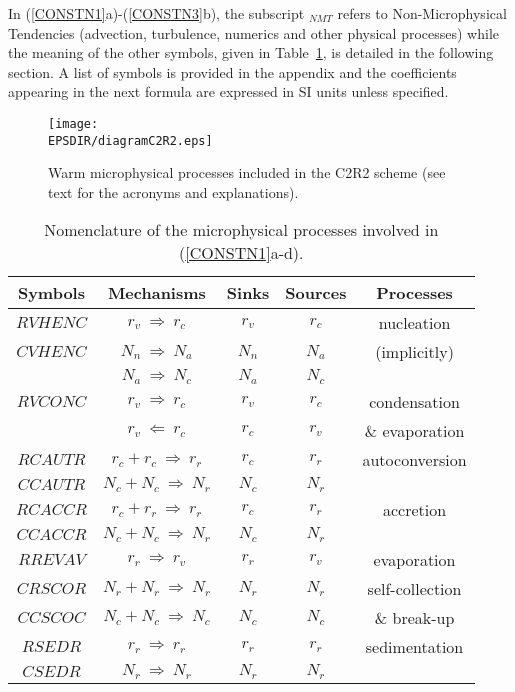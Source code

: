 \addtocounter{equation}{1}
%
\noindent In (\ref{CONSTN1}a)-(\ref{CONSTN3}b), the subscript $_{NMT}$ refers to
Non-Microphysical Tendencies (advection, turbulence, numerics and other physical
processes) while the meaning of the other symbols, given in Table~\ref{tabnomen}, is detailed
in the following section. A list of symbols is provided in the appendix and 
the coefficients appearing in the next formula are expressed in SI units unless
specified.

\begin{figure}[!ht]
\centerline{\texttt{[image: \\EPSDIR/diagramC2R2.eps]}}
\caption{Warm microphysical processes included in the C2R2 scheme (see text for
the acronyms and explanations).}
\label{diagramC2R2fig}
\end{figure}

\begin{table}
\caption{Nomenclature of the microphysical processes involved in (\ref{CONSTN1}a-d).}\label{tabnomen}
\begin{center}
\begin{tabular}{|c|c|c|c|c|}
\hline
Symbols & Mechanisms & Sinks & Sources & Processes \\
\hline \hline
$RVHENC$ & $r_v\ \Longrightarrow \ r_c$ & $r_v$ & $r_c$ & nucleation \\
$CVHENC$ & $N_n\ \Longrightarrow \ N_a$ & $N_n$ & $N_a$ & (implicitly) \\
         & $N_a\ \Longrightarrow \ N_c$ & $N_a$ & $N_c$ & \\
\hline
$RVCONC$ & $r_v\ \Longrightarrow \ r_c$ & $r_v$ & $r_c$ & condensation \\
         & $r_v\ \Longleftarrow \ r_c$ & $r_c$ & $r_v$ & {\&} evaporation \\
\hline
$RCAUTR$ & $r_c+r_c\ \Longrightarrow \ r_r$ & $r_c$ & $r_r$ & autoconversion \\
$CCAUTR$ & $N_c+N_c\ \Longrightarrow \ N_r$ & $N_c$ & $N_r$ & \\
\hline
$RCACCR$ & $r_c+r_r\ \Longrightarrow \ r_r$ & $r_c$ & $r_r$ & accretion \\
$CCACCR$ & $N_c+N_c\ \Longrightarrow \ N_r$ & $N_c$ & $N_r$ & \\
\hline
$RREVAV$ & $r_r\ \Longrightarrow \ r_v$ & $r_r$ & $r_v$ & evaporation \\
\hline
$CRSCOR$ & $N_r+N_r\ \Longrightarrow \ N_r$ & $N_r$ & $N_r$  & self-collection \\ 
$CCSCOC$ & $N_c+N_c\ \Longrightarrow \ N_c$ & $N_c$ & $N_c$  & {\&} break-up \\
\hline
$RSEDR$ & $r_r\ \Longrightarrow \ r_r$ & $r_r$ & $r_r$ & sedimentation \\
$CSEDR$ & $N_r\ \Longrightarrow \ N_r$ & $N_r$ & $N_r$ & \\
\hline
\end{tabular}
\end{center}
\end{table}
